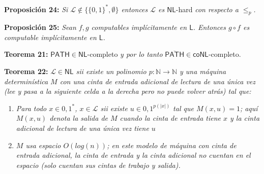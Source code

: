 \documentclass{article}
\begin{document}
\begin{flushleft}
  \textbf{Proposición 24:}
  \textit{Si $\mathcal{L} \not\in \{\{0,1\}^*, \emptyset\}$ entonces $\mathcal{L}$ es $\mathsf{NL}$}-hard
  \textit{con respecto a $\leq_p$.}
\end{flushleft}

\begin{flushleft}
  \textbf{Proposición 25:}
  \textit{Sean $f,g$ computables implícitamente en $\mathsf{L}$. Entonces $g \circ f$ es computable 
  implícitamente en $\mathsf{L}$.}
\end{flushleft}

\begin{flushleft}
  \textbf{Teorema 21:}
  $\mathsf{PATH} \in \mathsf{NL}$-completo \textit{y por lo tanto} $\overline{\mathsf{PATH}} \in \mathsf{coNL}$-completo.
\end{flushleft}

\begin{flushleft}
  \textbf{Teorema 22:}
  \textit{$\mathcal{L} \in \mathsf{NL}$ sii existe un polinomio $p : \mathbb{N} \rightarrow \mathbb{N}$ y una
  máquina determinística $M$ con una cinta de entrada adicional de lectura de una única vez (lee y pasa a la 
  siguiente celda a la derecha pero no puede volver atrás) tal que:}
\end{flushleft}
\begin{enumerate}
  \item \textit{Para todo $x \in {0, 1}^*$, $x \in \mathcal{L}$ sii existe $u \in {0, 1}^{p(|x|)}$ tal que $M (x, u) = 
  1$; aquí $M (x, u)$ denota la salida de $M$ cuando la cinta de entrada tiene $x$ y la cinta adicional de lectura 
  de una única vez tiene $u$}
  \item \textit{$M$ usa espacio $O(log(n))$; en este modelo de máquina con cinta de entrada adicional, la cinta de entrada 
  y la cinta adicional no cuentan en el espacio (solo cuentan sus cintas de trabajo y salida).}
\end{enumerate}
\end{document}
